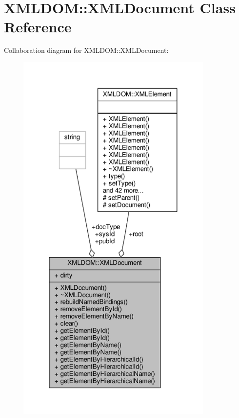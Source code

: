\hypertarget{classXMLDOM_1_1XMLDocument}{}\section{X\+M\+L\+D\+OM\+:\+:X\+M\+L\+Document Class Reference}
\label{classXMLDOM_1_1XMLDocument}


Collaboration diagram for X\+M\+L\+D\+OM\+:\+:X\+M\+L\+Document\+:
\nopagebreak
\begin{figure}[H]
\begin{center}
\leavevmode
\includegraphics[width=277pt]{d8/d5a/classXMLDOM_1_1XMLDocument__coll__graph}
\end{center}
\end{figure}
